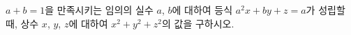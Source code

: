 $a+b=1$을 만족시키는 임의의 실수 $a$, $b$에 대하여 등식 $a^2x+by+z=a$가 성립할 때, 상수 $x$, $y$, $z$에 대하여 $x^2+y^2+z^2$의 값을 구하시오.
